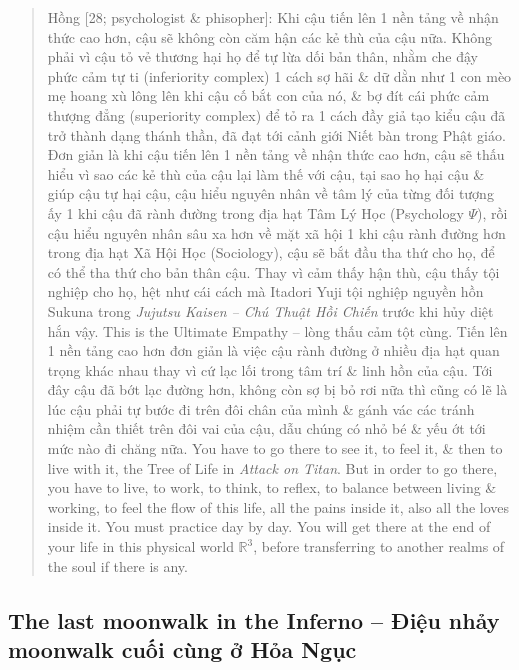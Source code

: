 \documentclass[12pt]{article}
\begin{document}
\begin{quote}
	{\sf Hồng [28; psychologist \& phisopher]}: Khi cậu tiến lên 1 nền tảng về nhận thức cao hơn, cậu sẽ không còn căm hận các kẻ thù của cậu nữa. Không phải vì cậu tỏ vẻ thương hại họ để tự lừa dối bản thân, nhằm che đậy phức cảm tự ti (inferiority complex) 1 cách sợ hãi \& dữ dằn như 1 con mèo mẹ hoang xù lông lên khi cậu cố bắt con của nó, \& bợ đít cái phức cảm thượng đẳng (superiority complex) để tỏ ra 1 cách đầy giả tạo kiểu cậu đã trở thành dạng thánh thần, đã đạt tới cảnh giới Niết bàn trong Phật giáo. Đơn giản là khi cậu tiến lên 1 nền tảng về nhận thức cao hơn, cậu sẽ thấu hiểu vì sao các kẻ thù của cậu lại làm thế với cậu, tại sao họ hại cậu \& giúp cậu tự hại cậu, cậu hiểu nguyên nhân về tâm lý của từng đối tượng ấy 1 khi cậu đã rành đường trong địa hạt Tâm Lý Học (Psychology $\Psi$), rồi cậu hiểu nguyên nhân sâu xa hơn về mặt xã hội 1 khi cậu rành đường hơn trong địa hạt Xã Hội Học (Sociology), cậu sẽ bắt đầu tha thứ cho họ, để có thể tha thứ cho bản thân cậu. Thay vì cảm thấy hận thù, cậu thấy tội nghiệp cho họ, hệt như cái cách mà Itadori Yuji tội nghiệp nguyền hồn Sukuna trong {\it Jujutsu Kaisen -- Chú Thuật Hồi Chiến} trước khi hủy diệt hắn vậy. This is the Ultimate Empathy -- lòng thấu cảm tột cùng. Tiến lên 1 nền tảng cao hơn đơn giản là việc cậu rành đường ở nhiều địa hạt quan trọng khác nhau thay vì cứ lạc lối trong tâm trí \& linh hồn của cậu. Tới đây cậu đã bớt lạc đường hơn, không còn sợ bị bỏ rơi nữa thì cũng có lẽ là lúc cậu phải tự bước đi trên đôi chân của mình \& gánh vác các tránh nhiệm cần thiết trên đôi vai của cậu, dẫu chúng có nhỏ bé \& yếu ớt tới mức nào đi chăng nữa. You have to go there to see it, to feel it, \& then to live with it, the Tree of Life in {\it Attack on Titan}. But in order to go there, you have to live, to work, to think, to reflex, to balance between living \& working, to feel the flow of this life, all the pains inside it, also all the loves inside it. You must practice day by day. You will get there at the end of your life in this physical world $\mathbb{R}^3$, before transferring to another realms of the soul if there is any.
\end{quote}

\subsection{The last moonwalk in the Inferno -- Điệu nhảy moonwalk cuối cùng ở Hỏa Ngục}
\end{document}
